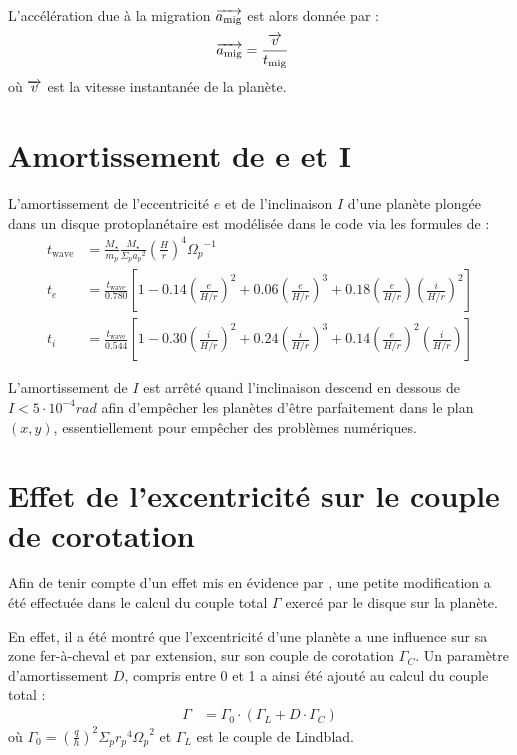 L'accélération due à la migration ${\overrightarrow{a_\text{mig}}}$ est alors donnée par :
\begin{align}
{\overrightarrow{a_\text{mig}}} &= \frac{{\overrightarrow{v}}}{t_\text{mig}}
\end{align}
où ${\overrightarrow{v}}$ est la vitesse instantanée de la planète.

\section{Amortissement de e et I}
L'amortissement de l'eccentricité $e$ et de l'inclinaison $I$ d'une planète plongée dans un disque protoplanétaire est modélisée dans le code via les formules de \cite[eq. (9), (11) et (12)]{cresswell2008three} : 
\begin{subequations}
\begin{align}
t_\text{wave} &= \frac{M_\star}{m_p}\frac{M_\star}{\Sigma_p {a_p}^2}\left(\frac{H}{r}\right)^4{\Omega_p}^{-1}\\
t_e &= \frac{t_\text{wave}}{0.780}\left[1-0.14\left(\frac{e}{H/r}\right)^2 + 0.06 \left(\frac{e}{H/r}\right)^3 + 0.18\left(\frac{e}{H/r}\right)\left(\frac{i}{H/r}\right)^2\right]\\
t_i &= \frac{t_\text{wave}}{0.544}\left[1-0.30\left(\frac{i}{H/r}\right)^2 + 0.24 \left(\frac{i}{H/r}\right)^3 + 0.14\left(\frac{e}{H/r}\right)^2\left(\frac{i}{H/r}\right)\right]
\end{align}
\end{subequations}

L'amortissement de $I$ est arrêté quand l'inclinaison descend en dessous de $I<5\cdot 10^{-4}\unit{rad}$ afin d'empêcher les planètes d'être parfaitement dans le plan $(x,y)$, essentiellement pour empêcher des problèmes numériques.

\section{Effet de l'excentricité sur le couple de corotation}
Afin de tenir compte d'un effet mis en évidence par \cite{bitsch2010orbital}, une petite modification a été effectuée dans le calcul du couple total $\Gamma$ exercé par le disque sur la planète. 

En effet, il a été montré que l'excentricité d'une planète a une influence sur sa zone fer-à-cheval et par extension, sur son couple de corotation $\Gamma_C$. Un paramètre d'amortissement $D$, compris entre 0 et 1 a ainsi été ajouté au calcul du couple total :
\begin{align}
\Gamma &= \Gamma_0 \cdot (\Gamma_L + D\cdot \Gamma_C)
\end{align}
où $\Gamma_0 = \left(\frac{q}{h}\right)^2\Sigma_p {r_p}^4 {\Omega_p}^2$ et $\Gamma_L$ est le couple de Lindblad.

